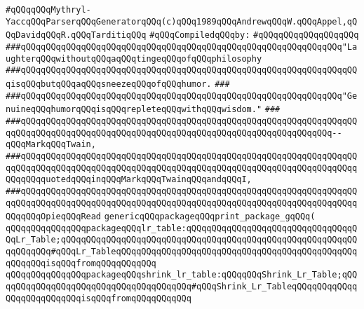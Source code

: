 \label{src/app/yacc/src/print-package-g.pkg}
\verb|#qQQqqQQqMythryl-YaccqQQqParserqQQqGeneratorqQQq(c)qQQq1989qQQqAndrewqQQqW.qQQqAppel,qQQqDavidqQQqR.qQQqTarditiqQQq|\newline
\newline
\verb|#qQQqCompiledqQQqby:|\newline
\verb|#qQQqqQQqqQQqqQQqqQQq|\newline
\newline
\verb|###qQQqqQQqqQQqqQQqqQQqqQQqqQQqqQQqqQQqqQQqqQQqqQQqqQQqqQQqqQQqqQQq"LaughterqQQqwithoutqQQqaqQQqtingeqQQqofqQQqphilosophy|\newline
\verb|###qQQqqQQqqQQqqQQqqQQqqQQqqQQqqQQqqQQqqQQqqQQqqQQqqQQqqQQqqQQqqQQqqQQqisqQQqbutqQQqaqQQqsneezeqQQqofqQQqhumor.|\newline
\verb|###|\newline
\verb|###qQQqqQQqqQQqqQQqqQQqqQQqqQQqqQQqqQQqqQQqqQQqqQQqqQQqqQQqqQQqqQQq"GenuineqQQqhumorqQQqisqQQqrepleteqQQqwithqQQqwisdom."|\newline
\verb|###|\newline
\verb|###qQQqqQQqqQQqqQQqqQQqqQQqqQQqqQQqqQQqqQQqqQQqqQQqqQQqqQQqqQQqqQQqqQQqqQQqqQQqqQQqqQQqqQQqqQQqqQQqqQQqqQQqqQQqqQQqqQQqqQQqqQQqqQQqqQQq--qQQqMarkqQQqTwain,|\newline
\verb|###qQQqqQQqqQQqqQQqqQQqqQQqqQQqqQQqqQQqqQQqqQQqqQQqqQQqqQQqqQQqqQQqqQQqqQQqqQQqqQQqqQQqqQQqqQQqqQQqqQQqqQQqqQQqqQQqqQQqqQQqqQQqqQQqqQQqqQQqqQQqqQQqquotedqQQqinqQQqMarkqQQqTwainqQQqandqQQqI,|\newline
\verb|###qQQqqQQqqQQqqQQqqQQqqQQqqQQqqQQqqQQqqQQqqQQqqQQqqQQqqQQqqQQqqQQqqQQqqQQqqQQqqQQqqQQqqQQqqQQqqQQqqQQqqQQqqQQqqQQqqQQqqQQqqQQqqQQqqQQqqQQqqQQqqQQqOpieqQQqRead|\newline
\newline
\newline
\newline
\verb|genericqQQqpackageqQQqprint_package_gqQQq(|\newline
\newline
\verb|qQQqqQQqqQQqqQQqpackageqQQqlr_table:qQQqqQQqqQQqqQQqqQQqqQQqqQQqqQQqqQQqLr_Table;qQQqqQQqqQQqqQQqqQQqqQQqqQQqqQQqqQQqqQQqqQQqqQQqqQQqqQQqqQQqqQQqqQQq#qQQqLr_TableqQQqqQQqqQQqqQQqqQQqqQQqqQQqqQQqqQQqqQQqqQQqqQQqqQQqqQQqisqQQqfromqQQqqQQqqQQq|\newline
\verb|qQQqqQQqqQQqqQQqpackageqQQqshrink_lr_table:qQQqqQQqShrink_Lr_Table;qQQqqQQqqQQqqQQqqQQqqQQqqQQqqQQqqQQqqQQq#qQQqShrink_Lr_TableqQQqqQQqqQQqqQQqqQQqqQQqqQQqisqQQqfromqQQqqQQqqQQq|\newline
